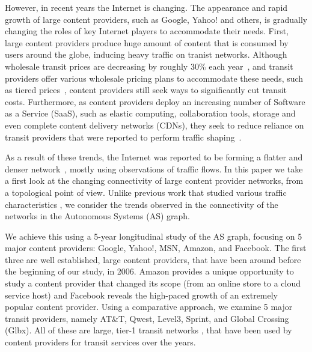 \documentclass[conference]{IEEEtran}
\newcommand{\ignore}[1]{}
\begin{document}
However, in recent years the Internet is changing. The appearance and rapid growth
of large content providers, such as Google, Yahoo! and others, is gradually changing the 
roles of key Internet players to accommodate their needs. First, large content providers produce huge
amount of content that is consumed by users around the globe, inducing heavy traffic on tranist networks.
Although wholesale transit prices are decreasing by roughly 30\% each year~\cite{peer}, and transit
providers offer various wholesale pricing plans to accommodate these needs, such as tiered prices~\cite{tiers},
content providers still seek ways to significantly cut transit costs. Furthermore, as content providers 
deploy an increasing number of Software as a Service (SaaS), such as elastic computing, collaboration tools, storage
and even complete content delivery networks (CDNs), they seek to reduce reliance on transit providers
that were reported to perform traffic shaping~\cite{beverly2007,amogh2008}.

\ignore{
Previous papers made various assumptions regarding the way these content
provider networks are operated. For example, attempting to reduce costs
was assumed \cite{incomplete} to be achieved by peering with transit networks, large and small, identifying hot-spots
and quickly reacting to changes in the observed traffic. However most of these assumptions are
mostly learned guesses, and are not backed by real observations.

Moreover, although the rapid growth of these networks clearly effects other large players
in the Internet's ecosystem, this effect was never thoroughly studied.
}

As a result of these trends, the Internet was reported to be forming a flatter and denser
network~\cite{flatnet,labovitz,amogh2010}, mostly using observations of traffic flows. 
In this paper we take a first look at the changing connectivity of large content provider
networks, from a topological point of view. Unlike previous work
that studied various traffic characteristics \cite{sprint,maier2009,labovitz}, we consider
the trends observed in the connectivity of the networks in the Autonomous Systems (AS) graph.

We achieve this
using a 5-year longitudinal study of the AS graph, focusing on 5 major content providers: Google, Yahoo!, MSN,
Amazon, and Facebook. The first three are well established, large content providers, that
have been around before the beginning of our study, in 2006.
Amazon provides a unique opportunity to study a content provider that changed its
scope (from an online store to a cloud service host) and Facebook reveals
the high-paced growth of an extremely popular content
provider. Using a comparative approach, we examine 5 major transit providers, namely AT\&T, Qwest, Level3,
Sprint, and Global Crossing (Glbx). All of these are large, tier-1 transit networks \cite{ground-truth}, that have been used
by content providers for transit services over the years.
\end{document}
